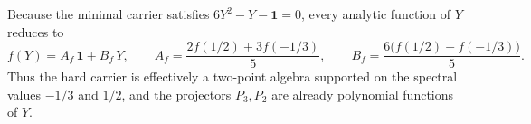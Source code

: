 \begin{remark}
Because the minimal carrier satisfies $6Y^2-Y-\mathbf 1=0$, every analytic function of $Y$ reduces to
\[
f(Y)=A_f\,\mathbf 1+B_f\,Y,
\qquad
A_f=\frac{2f(1/2)+3f(-1/3)}{5},
\qquad
B_f=\frac{6\bigl(f(1/2)-f(-1/3)\bigr)}{5}.
\]
Thus the hard carrier is effectively a two-point algebra supported on the spectral values $-1/3$ and $1/2$, and the projectors $P_3,P_2$ are already polynomial functions of $Y$.
\end{remark}
